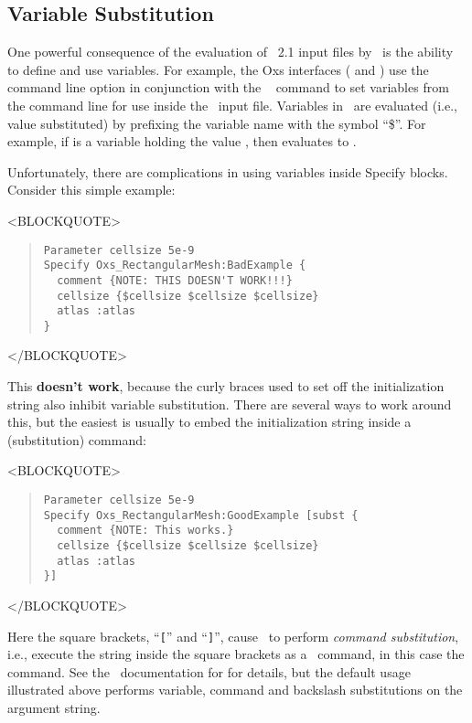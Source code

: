 \subsection{Variable Substitution}%
\label{sec:varSubst}
One powerful consequence of the evaluation of \MIF~2.1 input files by
\Tcl\ is the ability to define and use variables.  For example,
the Oxs interfaces ( and )
use the  command line option in conjunction with
the \MIF\  command to
set variables from the command line for use inside the \MIF\ input file.
Variables in \Tcl\ are evaluated (i.e., value substituted)
by prefixing the variable name with the symbol ``\$''.  For example, if
 is a variable holding the value , then
 evaluates to .

Unfortunately, there are complications in using variables inside
Specify blocks.  Consider this simple example:
\begin{rawhtml}
<BLOCKQUOTE>
\end{rawhtml}
\begin{quote}
\begin{verbatim}
Parameter cellsize 5e-9
Specify Oxs_RectangularMesh:BadExample {
  comment {NOTE: THIS DOESN'T WORK!!!}
  cellsize {$cellsize $cellsize $cellsize}
  atlas :atlas
}
\end{verbatim}
\end{quote}
\begin{rawhtml}
</BLOCKQUOTE>
\end{rawhtml}
This \textbf{doesn't work}, because the curly braces used to set off the
 initialization string also inhibit variable substitution.
There are several ways to work around this, but the easiest is usually
to embed the initialization string inside a  (substitution)
command:
\begin{rawhtml}
<BLOCKQUOTE>
\end{rawhtml}
\begin{quote}
\begin{verbatim}
Parameter cellsize 5e-9
Specify Oxs_RectangularMesh:GoodExample [subst {
  comment {NOTE: This works.}
  cellsize {$cellsize $cellsize $cellsize}
  atlas :atlas
}]
\end{verbatim}
\end{quote}
\begin{rawhtml}
</BLOCKQUOTE>
\end{rawhtml}
Here the square brackets, ``\texttt{[}'' and ``\texttt{]}'',
cause \Tcl\ to perform \textit{command substitution}, i.e.,
execute the string inside the square brackets as a \Tcl\
command, in this case the  command.  See the \Tcl\
documentation for  for details, but the default
usage illustrated above performs variable, command and
backslash substitutions on the argument string.

